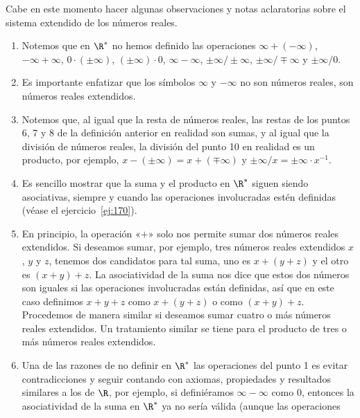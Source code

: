 \documentclass[12pt,a4paper]{book}
\begin{document}
    \begin{observacion}\label{obs:15}
        Cabe en este momento hacer algunas observaciones y notas
        aclaratorias sobre el sistema extendido de los números reales.
        \begin{enumerate}[label=\arabic*.]
            \item Notemos que en $\R^{*}$ no hemos definido las operaciones $\infty+(-\infty)$, $-\infty+\infty$,
            $0\cdot(\pm\infty)$, $(\pm\infty)\cdot 0$, $\infty-\infty$, $\pm\infty/\pm\infty$, $\pm\infty/\mp\infty$ y $\pm\infty/0$.
            \item Es importante enfatizar que los símbolos $\infty$ y $-\infty$ no son números reales,
            son números reales extendidos.
            \item Notemos que, al igual que la resta de números reales, las restas de los
            puntos 6, 7 y 8 de la definición anterior en realidad son sumas, y al igual
            que la división de números reales, la división del punto 10 en realidad es
            un producto, por ejemplo, $x-(\pm\infty)=x+(\mp\infty)$ y $\pm\infty/x=\pm\infty\cdot x^{-1}$.
            \item Es sencillo mostrar que la suma y el producto en $\R^{*}$ siguen siendo asociativas,
            siempre y cuando las operaciones involucradas estén definidas (véase
            el ejercicio~\ref{ej:170}).
            \item En principio, la operación «$+$» solo nos permite sumar dos números reales
            extendidos. Si deseamos sumar, por ejemplo, tres números reales extendidos
            $x$, $y$ y $z$, tenemos dos candidatos para tal suma, uno es $x+(y+z)$
            y el otro es $(x+y)+z$. La asociatividad de la suma nos dice que estos
            dos números son iguales si las operaciones involucradas están definidas, así
            que en este caso definimos $x+y+z$ como $x+(y+z)$ o como $(x+y)+z$.
            Procedemos de manera similar si deseamos sumar cuatro o más números
            reales extendidos. Un tratamiento similar se tiene para el producto de tres
            o más números reales extendidos.
            \item Una de las razones de no definir en $\R^{*}$ las operaciones del punto 1 es evitar
            contradicciones y seguir contando con axiomas, propiedades y resultados
            similares a los de $\R$, por ejemplo, si definiéramos $\infty-\infty$ como $0$, entonces la
            asociatividad de la suma en $\R^{*}$ ya no sería válida (aunque las operaciones

\end{enumerate}
\end{observacion}
\end{document}
